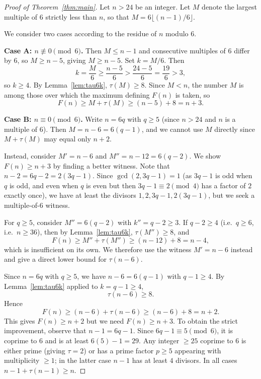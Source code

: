 \documentclass[a4paper]{amsart}
\theoremstyle{definition}
\begin{document}
\begin{proof}[Proof of Theorem~\ref{thm:main}]
Let $n > 24$ be an integer. Let $M$ denote the largest multiple of $6$ strictly less than $n$,
so that $M = 6\lfloor (n-1)/6 \rfloor$.

We consider two cases according to the residue of $n$ modulo $6$.

\textbf{Case A: $n \not\equiv 0 \pmod{6}$.}
Then $M \leq n - 1$ and consecutive multiples of $6$ differ by $6$, so $M \geq n - 5$,
giving $M \geq n - 5$. Set $k = M/6$. Then
\[
k = \frac{M}{6} \geq \frac{n-5}{6} > \frac{24-5}{6} = \frac{19}{6} > 3,
\]
so $k \geq 4$. By Lemma~\ref{lem:tau6k}, $\tau(M) \geq 8$.
Since $M < n$, the number $M$ is among those over which the maximum defining $F(n)$ is taken,
so
\[
F(n) \geq M + \tau(M) \geq (n - 5) + 8 = n + 3.
\]

\textbf{Case B: $n \equiv 0 \pmod{6}$.}
Write $n = 6q$ with $q \geq 5$ (since $n > 24$ and $n$ is a multiple of $6$).
Then $M = n - 6 = 6(q-1)$, and we cannot use $M$ directly since $M + \tau(M)$
may equal only $n + 2$.

Instead, consider $M' = n - 6$ and $M'' = n - 12 = 6(q-2)$.
We show $F(n) \geq n + 3$ by finding a better witness.
Note that $n - 2 = 6q - 2 = 2(3q - 1)$.
Since $\gcd(2, 3q-1) = 1$ (as $3q - 1$ is odd when $q$ is odd, and even when $q$ is even
but then $3q-1 \equiv 2 \pmod 4$ has a factor of $2$ exactly once), we have at least
the divisors $1, 2, 3q-1, 2(3q-1)$, but we seek a multiple-of-$6$ witness.

For $q \geq 5$, consider $M'' = 6(q-2)$ with $k'' = q - 2 \geq 3$.
If $q - 2 \geq 4$ (i.e.\ $q \geq 6$, i.e.\ $n \geq 36$), then by Lemma~\ref{lem:tau6k},
$\tau(M'') \geq 8$, and
\[
F(n) \geq M'' + \tau(M'') \geq (n - 12) + 8 = n - 4,
\]
which is insufficient on its own. We therefore use the witness $M' = n - 6$ instead
and give a direct lower bound for $\tau(n - 6)$.

Since $n = 6q$ with $q \geq 5$, we have $n - 6 = 6(q-1)$ with $q - 1 \geq 4$.
By Lemma~\ref{lem:tau6k} applied to $k = q - 1 \geq 4$,
\[
\tau(n - 6) \geq 8.
\]
Hence
\[
F(n) \geq (n - 6) + \tau(n - 6) \geq (n - 6) + 8 = n + 2.
\]
This gives $F(n) \geq n + 2$ but we need $F(n) \geq n + 3$.
To obtain the strict improvement, observe that $n - 1 = 6q - 1$.
Since $6q - 1 \equiv 5 \pmod 6$, it is coprime to $6$ and is at least $6(5) - 1 = 29$.
Any integer $\geq 25$ coprime to $6$ is either prime (giving $\tau = 2$) or has a prime
factor $p \geq 5$ appearing with multiplicity $\geq 1$; in the latter case
$n - 1$ has at least $4$ divisors. In all cases $n - 1 + \tau(n-1) \geq n$.


\end{proof}
\end{document}
